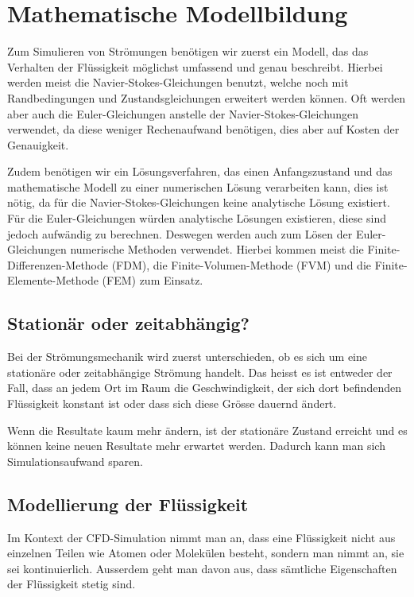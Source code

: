 %
%
%
%
\section{Mathematische Modellbildung
\label{openfoam:section:teil1}}
Zum Simulieren von Strömungen benötigen wir zuerst ein Modell, das das Verhalten der Flüssigkeit möglichst umfassend und genau beschreibt. 
Hierbei werden meist die Navier-Stokes-Gleichungen benutzt, welche noch mit Randbedingungen und Zustandsgleichungen erweitert werden können. 
Oft werden aber auch die Euler-Gleichungen anstelle der Navier-Stokes-Gleichungen verwendet, da diese weniger Rechenaufwand benötigen,
%
dies aber auf Kosten der Genauigkeit.

Zudem benötigen wir ein Lösungsverfahren, das einen Anfangszustand und das mathematische Modell zu einer numerischen Lösung verarbeiten kann, dies ist nötig, da für die Navier-Stokes-Gleichungen keine analytische Lösung existiert.
Für die Euler-Gleichungen würden analytische Lösungen existieren, diese sind jedoch aufwändig zu berechnen.
%
Deswegen werden auch zum Lösen der Euler-Gleichungen numerische Methoden verwendet.
Hierbei kommen meist die Finite-Differenzen-Methode (FDM), die Finite-Volumen-Methode (FVM) und die Finite-Elemente-Methode (FEM) zum Einsatz. 
%
%
%
%
%
%

\subsection{Stationär oder zeitabhängig?}
Bei der Strömungsmechanik wird zuerst unterschieden, ob es sich um eine stationäre oder zeitabhängige Strömung handelt.
%
%
Das heisst es ist entweder der Fall, dass an jedem Ort im Raum die Geschwindigkeit, der sich dort befindenden Flüssigkeit  konstant ist oder dass sich diese Grösse dauernd ändert.

Wenn die Resultate kaum mehr ändern, ist der stationäre Zustand erreicht und es können keine neuen Resultate mehr erwartet werden.
Dadurch kann man sich Simulationsaufwand sparen.

\subsection{Modellierung der Flüssigkeit}
Im Kontext der CFD-Simulation nimmt man an, dass eine Flüssigkeit nicht aus einzelnen Teilen wie Atomen oder Molekülen besteht, sondern man nimmt an, sie sei kontinuierlich. 
Ausserdem geht man davon aus, dass sämtliche Eigenschaften der Flüssigkeit stetig sind. 


